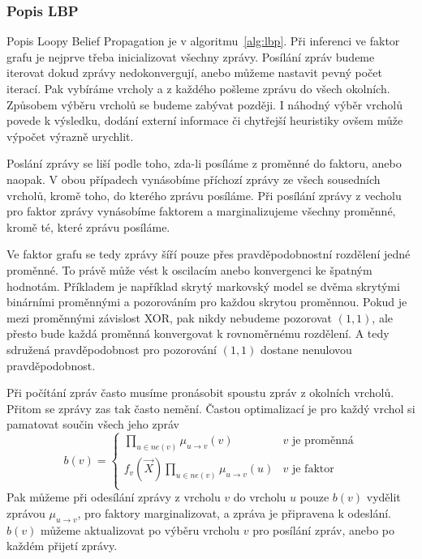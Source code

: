 \subsubsection{Popis LBP}

Popis Loopy Belief Propagation je v algoritmu~\ref{alg:lbp}.
Při inferenci ve faktor grafu je nejprve třeba inicializovat všechny zprávy.
Posílání zpráv budeme iterovat dokud zprávy nedokonvergují, anebo můžeme nastavit pevný počet iterací.
Pak vybíráme vrcholy a z každého pošleme zprávu do všech okolních.
Způsobem výběru vrcholů se budeme zabývat později.
I náhodný výběr vrcholů povede k výsledku, dodání externí informace či chytřejší heuristiky ovšem může výpočet výrazně urychlit.

Poslání zprávy se liší podle toho, zda-li posíláme z proměnné do faktoru, anebo naopak.
V obou případech vynásobíme příchozí zprávy ze všech sousedních vrcholů, kromě toho, do kterého zprávu posíláme.
Při posílání zprávy z vecholu pro faktor zprávy vynásobíme faktorem a marginalizujeme všechny proměnné, kromě té, které zprávu posíláme.

Ve faktor grafu se tedy zprávy šíří pouze přes pravděpodobnostní rozdělení jedné proměnné.
To právě může vést k oscilacím anebo konvergenci ke špatným hodnotám. 
Příkladem je například skrytý markovský model se dvěma skrytými binárními proměnnými a pozorováním pro každou skrytou proměnnou.
Pokud je mezi proměnnými závislost XOR, pak nikdy nebudeme pozorovat $(1, 1)$, ale přesto bude každá proměnná konvergovat k rovnoměrnému rozdělení. A tedy sdružená pravděpodobnost pro pozorování $(1, 1)$ dostane nenulovou pravděpodobnost.

Při počítání zpráv často musíme pronásobit spoustu zpráv z okolních vrcholů.
Přitom se zprávy zas tak často nemění.
Častou optimalizací je pro každý vrchol si pamatovat součin všech jeho zpráv
\begin{equation}
    b(v) = \begin{cases}
        \prod_{u \in ne(v)} \mu_{u \rightarrow v}(v) & \mbox{$v$ je proměnná} \\
        f_v(\vec{X}) \prod_{u \in ne(v)} \mu_{u \rightarrow v}(u) & \mbox{$v$ je faktor} \\
    \end{cases}
\end{equation}
Pak můžeme při odesílání zprávy z vrcholu $v$ do vrcholu $u$ pouze $b(v)$ vydělit zprávou $\mu_{u \rightarrow v}$, pro faktory marginalizovat, a zpráva je připravena k odeslání.
$b(v)$ můžeme aktualizovat po výběru vrcholu $v$ pro posílání zpráv, anebo po každém přijetí zprávy.


